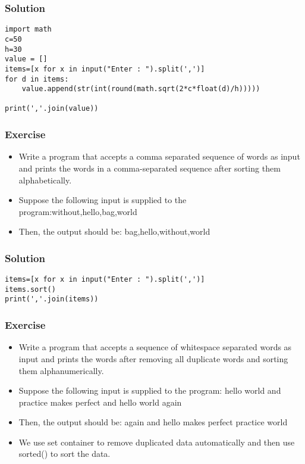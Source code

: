 \begin{frame}[fragile]\frametitle{Solution}
  \begin{lstlisting}
import math
c=50
h=30
value = []
items=[x for x in input("Enter : ").split(',')]
for d in items:
    value.append(str(int(round(math.sqrt(2*c*float(d)/h)))))

print(','.join(value))
  \end{lstlisting}
\end{frame}



\begin{frame}[fragile]\frametitle{Exercise}
  \begin{itemize}
  \item Write a program that accepts a comma separated sequence of words as input and prints the words in a comma-separated sequence after sorting them alphabetically.
  \item Suppose the following input is supplied to the program:without,hello,bag,world
  \item Then, the output should be: bag,hello,without,world
  \end{itemize}  
\end{frame}

\begin{frame}[fragile]\frametitle{Solution}
  \begin{lstlisting}
items=[x for x in input("Enter : ").split(',')]
items.sort()
print(','.join(items))
  \end{lstlisting}
\end{frame}

\begin{frame}[fragile]\frametitle{Exercise}
  \begin{itemize}
  \item Write a program that accepts a sequence of whitespace separated words as input and prints the words after removing all duplicate words and sorting them alphanumerically.
  \item Suppose the following input is supplied to the program: hello world and practice makes perfect and hello world again
  \item Then, the output should be: again and hello makes perfect practice world
  \item We use set container to remove duplicated data automatically and then use sorted() to sort the data.
  \end{itemize}  
\end{frame}

